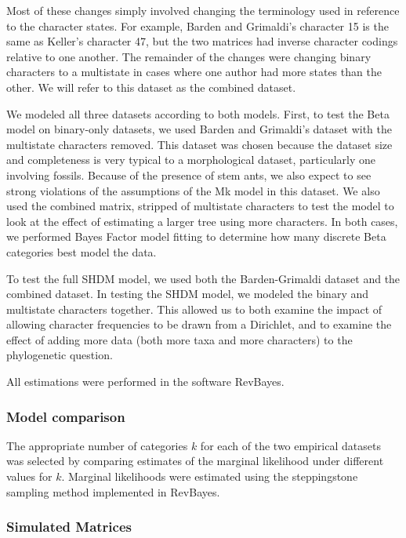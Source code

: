 \documentclass[]{article}
\begin{document}
Most of these changes simply involved changing the terminology used in reference to the character states.
For example, Barden and Grimaldi's character 15 is the same as Keller's character 47, but the two matrices had inverse character codings relative to one another.
The remainder of the changes were changing binary characters to a multistate in cases where one author had more states than the other. 
We will refer to this dataset as the combined dataset. \par
We modeled all three datasets according to both models.
First, to test the Beta model on binary-only datasets, we used Barden and Grimaldi's dataset with the multistate characters removed.
This dataset was chosen because the dataset size and completeness is very typical to a morphological dataset, particularly one involving fossils.
Because of the presence of stem ants, we also expect to see strong violations of the assumptions of the Mk model in this dataset.
We also used the combined matrix, stripped of multistate characters to test the model to look at the effect of estimating a larger tree using more characters.
In both cases, we performed Bayes Factor model fitting to determine how many discrete Beta categories best model the data. \par
To test the full SHDM model, we used both the Barden-Grimaldi dataset and the combined dataset.
In testing the SHDM model, we modeled the binary and multistate characters together.
This allowed us to both examine the impact of allowing character frequencies to be drawn from a Dirichlet, and to examine the effect of adding more data (both more taxa and more characters) to the phylogenetic question. 
\par
All estimations were performed in the software RevBayes.
\subsubsection{Model comparison}

The appropriate number of categories $k$ for each of the two empirical datasets was selected by comparing estimates of the marginal likelihood under different values for $k$.
Marginal likelihoods were estimated using the steppingstone sampling method \citep{xie2010improving} implemented in RevBayes.


\subsubsection{Simulated Matrices}
\end{document}
